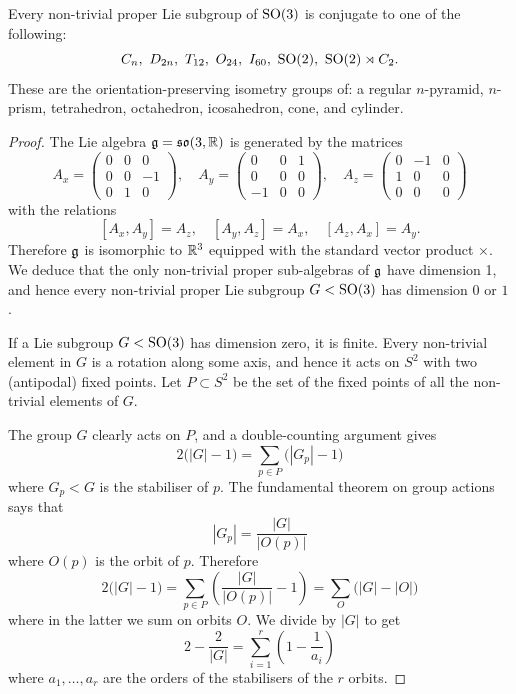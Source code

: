 \begin{prop} \label{subgroups:SO3:prop}
Every non-trivial proper Lie subgroup of ${\rm SO}(3)$ is conjugate to one of the following:
$$C_n, \ D_{2n},\ T_{12},\ O_{24},\ I_{60},\ \SO(2),\ \SO(2) \rtimes C_2.$$
These are the orientation-preserving isometry groups of: a regular $n$-pyramid, $n$-prism, tetrahedron, octahedron, icosahedron, cone, and cylinder.
\end{prop}
\begin{proof}
The Lie algebra $\mathfrak{g} = \mathfrak{so}(3,\mathbb{R})$ is generated by the matrices
$$A_x = \begin{pmatrix} 0 & 0 & 0 \\ 0 & 0 & -1 \\ 0 & 1 & 0 \end{pmatrix}, \quad
A_y = \begin{pmatrix} 0 & 0 & 1 \\ 0 & 0 & 0 \\ -1 & 0 & 0 \end{pmatrix}, \quad
A_z = \begin{pmatrix} 0 & -1 & 0 \\ 1 & 0 & 0 \\ 0 & 0 & 0 \end{pmatrix} $$
with the relations
$$[A_x, A_y] = A_z, \quad [A_y, A_z] = A_x, \quad [A_z, A_x] = A_y.$$
Therefore $\mathfrak{g}$ is isomorphic to $\mathbb{R}^3$ equipped with the standard vector product $\times$. We deduce that the only non-trivial proper sub-algebras of $\mathfrak{g}$ have dimension 1, and hence every non-trivial proper Lie subgroup $G<{\rm SO}(3)$ has dimension $0$ or $1$.

If a Lie subgroup $G<{\rm SO}(3)$ has dimension zero, it is finite. Every non-trivial element in $G$ is a rotation along some axis, and hence it acts on $S^2$ with two (antipodal) fixed points.
Let $P\subset S^2$ be the set of the fixed points of all the non-trivial elements of $G$. 

The group $G$ clearly acts on $P$, and a double-counting argument gives
$$2\big(|G| - 1\big) = \sum_{p \in P}\big(|G_p| - 1\big)$$
where $G_p < G$ is the stabiliser of $p$. The fundamental theorem on group actions says that 
$$|G_p| = \frac{|G|}{|O(p)|}$$
where $O(p)$ is the orbit of $p$. Therefore
$$2\big(|G| - 1\big) = \sum_{p \in P}\left(\frac{|G|}{|O(p)|} - 1\right) = 
\sum_{O}\big({|G|} - |O|\big)
$$
where in the latter we sum on orbits $O$. We divide by $|G|$ to get
\begin{equation} \label{G:orbit:eqn}
2-\frac 2{|G|}  = \sum_{i=1}^r \left(1- \frac 1{a_i}\right)
\end{equation}
where $a_1,\ldots, a_r$ are the orders of the stabilisers of the $r$ orbits.


\end{proof}
